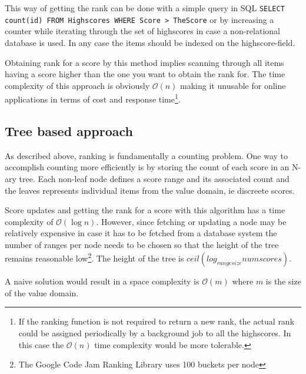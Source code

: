 This way of getting the rank can be done with a simple query in SQL
\texttt{SELECT count(id) FROM Highscores WHERE Score > TheScore} or by increasing a counter while iterating through the set of highscores in case a non-relational database is used. In any case the items should be indexed on the highscore-field.

Obtaining rank for a score by this method implies scanning through all items having a score higher than the one you want to obtain the rank for. The time complexity of this approach is obviously $\mathcal{O}(n)$ making it unusable for online applications in terms of cost and response time\footnote{If the ranking function is not required to return a new rank, the actual rank could be assigned periodically by a background job to all the highscores. In this case the $\mathcal{O}(n)$ time complexity would be more tolerable.}.

\subsection{Tree based approach}

As described above, ranking is fundamentally a counting problem. One way to accomplish counting more efficiently is by storing the count of each score in an N-ary tree. Each non-leaf node defines a score range and its associated count and the leaves represents individual items from the value domain, ie discreete scores.

Score updates and getting the rank for a score with this algorithm has a time complexity of $\mathcal{O}(\log{} n)$. However, since fetching or updating a node may be relatively expensive in case it has to be fetched from a database system the number of ranges per node needs to be chosen so that the height of the tree remains reasonable low\footnote{The Google Code Jam Ranking Library uses 100 buckets per node}. The height of the tree is $ceil(log_{rangesize}numscores)$.

A naive solution would result in a space complexity is $\mathcal{O}(m)$ where $m$ is the size of the value domain. 



